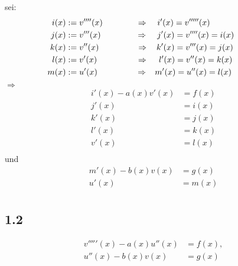 \documentclass[10pt,oneside,a4paper]{scrartcl}
\begin{document}
        sei:
        \begin{align*}
            i(x) &:= v''''(x) \hspace{4.0em} \Rightarrow &i'(x) = v'''''(x)
            \hspace{5.9em}\\
            j(x) &:= v'''(x) \hspace{4.2em} \Rightarrow &j'(x) = v''''(x) = i(x)
            \hspace{3em}\\
            k(x) &:= v''(x) \hspace{4.5em} \Rightarrow &k'(x) = v'''(x) = j(x)
            \hspace{3.1em}\\
            l(x) &:= v'(x) \hspace{4.7em} \Rightarrow &l'(x) = v''(x) = k(x)
            \hspace{3.2em}\\
            m(x) &:= u'(x) \hspace{4.6em} \Rightarrow &m'(x) = u''(x) = l(x)
            \hspace{3.3em}\\
        \end{align*}
		$\Rightarrow$
		\begin{align*}
		  i'(x) - a(x)v'(x) & = f(x)\\
		  j'(x) & = i(x)\\
		  k'(x) & = j(x)\\
		  l'(x) & = k(x)\\
		  v'(x) & = l(x)\\
		\end{align*}
        und
        \begin{align*}
          m'(x) - b(x)v(x) & = g(x)\\
          u'(x) & = m(x)\\
        \end{align*}
        		
		\subsection*{1.2}

		\begin{align*}
			v'''''(x) - a(x)u''(x) &= f(x),	\\
			u''(x) - b(x)v(x) &= g(x)
		\end{align*}
\end{document}
